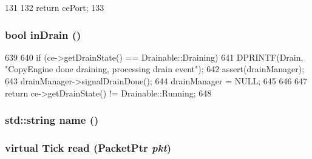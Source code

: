 \begin{DoxyCode}
131 {
132     return cePort;
133 }
\end{DoxyCode}
\hypertarget{classCopyEngine_1_1CopyEngineChannel_ae377b3f8babf5878cbeded1e190a4893}{
\subsubsection[{inDrain}]{\setlength{\rightskip}{0pt plus 5cm}bool inDrain ()}}
\label{classCopyEngine_1_1CopyEngineChannel_ae377b3f8babf5878cbeded1e190a4893}



\begin{DoxyCode}
639 {
640     if (ce->getDrainState() == Drainable::Draining) {
641         DPRINTF(Drain, "CopyEngine done draining, processing drain event\n");
642         assert(drainManager);
643         drainManager->signalDrainDone();
644         drainManager = NULL;
645     }
646 
647     return ce->getDrainState() != Drainable::Running;
648 }
\end{DoxyCode}
\hypertarget{classCopyEngine_1_1CopyEngineChannel_af1801e31af6399bccce114ab12575168}{
\subsubsection[{name}]{\setlength{\rightskip}{0pt plus 5cm}std::string name ()}}
\label{classCopyEngine_1_1CopyEngineChannel_af1801e31af6399bccce114ab12575168}



\hypertarget{classCopyEngine_1_1CopyEngineChannel_a3848226950f14efe17b2b251384cde95}{
\subsubsection[{read}]{\setlength{\rightskip}{0pt plus 5cm}virtual {\bf Tick} read ({\bf PacketPtr} {\em pkt})}}
\label{classCopyEngine_1_1CopyEngineChannel_a3848226950f14efe17b2b251384cde95}



